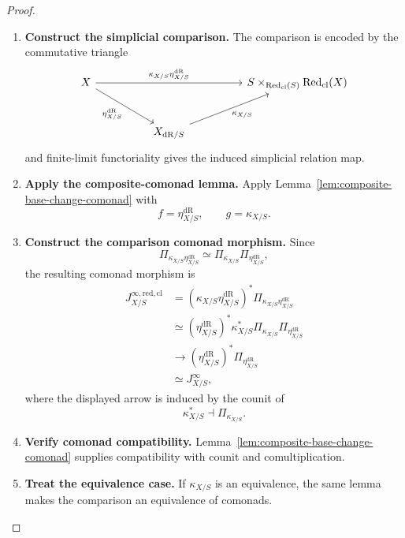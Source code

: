 \begin{proof}
\leavevmode
\begin{enumerate}[label=\textup{(\arabic*)}]
    \item \textbf{Construct the simplicial comparison.}
The comparison is encoded by the commutative triangle
\[
\begin{tikzcd}[column sep=huge,row sep=large]
X \ar[rr,"\kappa_{X/S}\eta_{X/S}^{\mathrm{dR}}"]
  \ar[dr,"\eta_{X/S}^{\mathrm{dR}}"']
&&
S\times_{\operatorname{Red}_{\mathrm{cl}}(S)}
  \operatorname{Red}_{\mathrm{cl}}(X)\\
&
X_{\mathrm{dR}/S}
  \ar[ur,"\kappa_{X/S}"']
&
\end{tikzcd}
\]
and finite-limit functoriality gives the induced simplicial relation map.

    \item \textbf{Apply the composite-comonad lemma.}
Apply Lemma~\ref{lem:composite-base-change-comonad} with
\[
  f=\eta_{X/S}^{\mathrm{dR}},
  \qquad
  g=\kappa_{X/S}.
\]

    \item \textbf{Construct the comparison comonad morphism.}
Since
\[
  \Pi_{\kappa_{X/S}\eta_{X/S}^{\mathrm{dR}}}
  \simeq
  \Pi_{\kappa_{X/S}}
  \Pi_{\eta_{X/S}^{\mathrm{dR}}},
\]
the resulting comonad morphism is
\[
\begin{aligned}
  J^{\infty,\mathrm{red,cl}}_{X/S}
  &=
  (\kappa_{X/S}\eta_{X/S}^{\mathrm{dR}})^*
  \Pi_{\kappa_{X/S}\eta_{X/S}^{\mathrm{dR}}}\\
  &\simeq
  (\eta_{X/S}^{\mathrm{dR}})^*
  \kappa_{X/S}^*
  \Pi_{\kappa_{X/S}}
  \Pi_{\eta_{X/S}^{\mathrm{dR}}}\\
  &\longrightarrow
  (\eta_{X/S}^{\mathrm{dR}})^*
  \Pi_{\eta_{X/S}^{\mathrm{dR}}}\\
  &\simeq
  J^\infty_{X/S},
\end{aligned}
\]
where the displayed arrow is induced by the counit of
\[
  \kappa_{X/S}^*\dashv\Pi_{\kappa_{X/S}}.
\]

    \item \textbf{Verify comonad compatibility.}
Lemma~\ref{lem:composite-base-change-comonad} supplies compatibility with
counit and comultiplication.

    \item \textbf{Treat the equivalence case.}
If \(\kappa_{X/S}\) is an
equivalence, the same lemma makes the comparison an equivalence of comonads.
\end{enumerate}
\end{proof}

